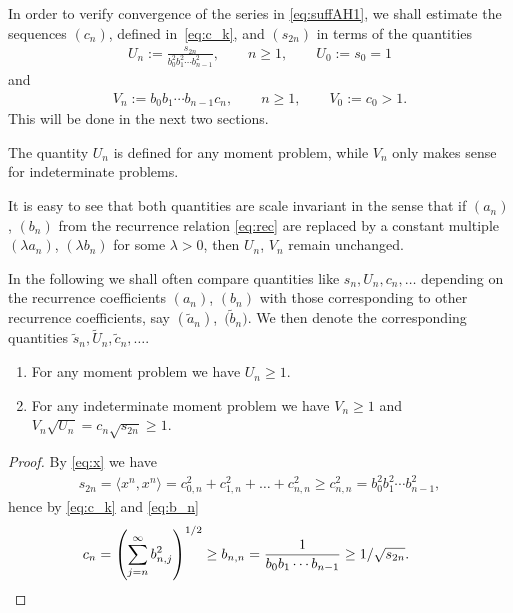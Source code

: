 In order to verify convergence of the series in \eqref{eq:suffAH1}, we shall estimate the sequences $(c_n)$, defined in~\eqref{eq:c_k}, and $(s_{2n})$ in terms of the quantities
\begin{gather}\label{eq:Un}
U_n:=\frac{s_{2n}}{b_0^2b_1^2\cdots b_{n-1}^2},\qquad n\ge 1,\qquad U_0:=s_0=1
\end{gather}
and
\begin{gather}\label{eq:Vn}
V_n:=b_0 b_1\cdots b_{n-1}c_n,\qquad n\ge 1,\qquad V_0:=c_0>1.
\end{gather}
This will be done in the next two sections.

The quantity $U_n$ is defined for any moment problem, while $V_n$ only makes sense for indeterminate problems.

It is easy to see that both quantities are scale invariant in the sense that if $(a_n)$, $(b_n)$ from the recurrence relation \eqref{eq:rec} are replaced by a constant multiple $(\lambda a_n)$, $(\lambda b_n)$ for some $\lambda>0$, then $U_n$, $V_n$ remain unchanged.

In the following we shall often compare quantities like $s_n,U_n,c_n,\ldots$ depending on the recurrence coefficients $(a_n)$, $(b_n)$ with those corresponding to other recurrence coefficients, say $(\tilde{a}_n)$,~$\big(\tilde{b}_n\big)$. We then denote the corresponding quantities $\tilde{s}_n,\tilde{U}_n,\tilde{c}_n,\ldots$.

\begin{lem}\label{thm:Un}\quad
\begin{enumerate}\itemsep=0pt
\item[$(i)$] For any moment problem we have $U_n\ge 1$.
 \item[$(ii)$] For any indeterminate moment problem we have $V_n\ge 1$ and $V_n\sqrt{U_n}=c_n\sqrt{s_{2n}}\ge 1$.
\end{enumerate}
\end{lem}

\begin{proof}By \eqref{eq:x} we have
\begin{gather*}
s_{2n}=\langle x^n,x^n\rangle=c_{0,n}^2+c_{1,n}^2+\dots +c_{n,n}^2 \ge c_{n,n}^2= b_0^2b_1^2\cdots b_{n-1}^2,
\end{gather*}
hence by \eqref{eq:c_k} and \eqref{eq:b_n}
\begin{gather*}
c_n=\left (\sum_{j=n}^\infty b_{n,j}^2\right )^{1/2}\ge b_{n,n}={1\over b_0b_1\cdots b_{n-1}} \ge 1/\sqrt{s_{2n}}.\tag*{\qed}
\end{gather*}\renewcommand{\qed}{}
\end{proof}


